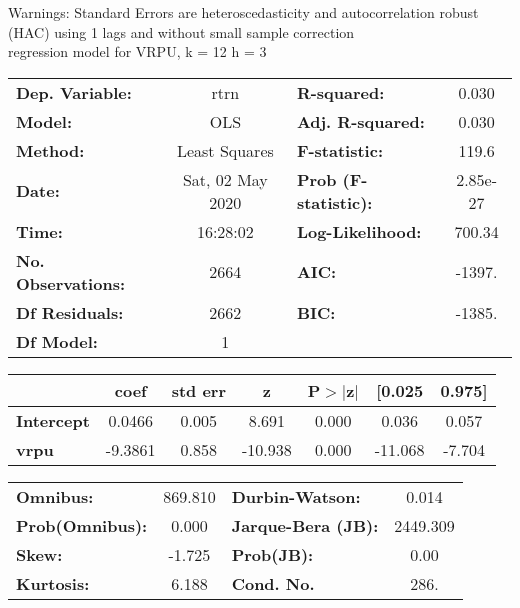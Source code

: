 Warnings: \newline
 [1] Standard Errors are heteroscedasticity and autocorrelation robust (HAC) using 1 lags and without small sample correction\\ 

regression model for VRPU, k = 12 h = 3\begin{center}
\begin{tabular}{lclc}
\toprule
\textbf{Dep. Variable:}    &       rtrn       & \textbf{  R-squared:         } &     0.030   \\
\textbf{Model:}            &       OLS        & \textbf{  Adj. R-squared:    } &     0.030   \\
\textbf{Method:}           &  Least Squares   & \textbf{  F-statistic:       } &     119.6   \\
\textbf{Date:}             & Sat, 02 May 2020 & \textbf{  Prob (F-statistic):} &  2.85e-27   \\
\textbf{Time:}             &     16:28:02     & \textbf{  Log-Likelihood:    } &    700.34   \\
\textbf{No. Observations:} &        2664      & \textbf{  AIC:               } &    -1397.   \\
\textbf{Df Residuals:}     &        2662      & \textbf{  BIC:               } &    -1385.   \\
\textbf{Df Model:}         &           1      & \textbf{                     } &             \\
\bottomrule
\end{tabular}
\begin{tabular}{lcccccc}
                   & \textbf{coef} & \textbf{std err} & \textbf{z} & \textbf{P$> |$z$|$} & \textbf{[0.025} & \textbf{0.975]}  \\
\midrule
\textbf{Intercept} &       0.0466  &        0.005     &     8.691  &         0.000        &        0.036    &        0.057     \\
\textbf{vrpu}      &      -9.3861  &        0.858     &   -10.938  &         0.000        &      -11.068    &       -7.704     \\
\bottomrule
\end{tabular}
\begin{tabular}{lclc}
\textbf{Omnibus:}       & 869.810 & \textbf{  Durbin-Watson:     } &    0.014  \\
\textbf{Prob(Omnibus):} &   0.000 & \textbf{  Jarque-Bera (JB):  } & 2449.309  \\
\textbf{Skew:}          &  -1.725 & \textbf{  Prob(JB):          } &     0.00  \\
\textbf{Kurtosis:}      &   6.188 & \textbf{  Cond. No.          } &     286.  \\
\bottomrule
\end{tabular}
\end{center}

